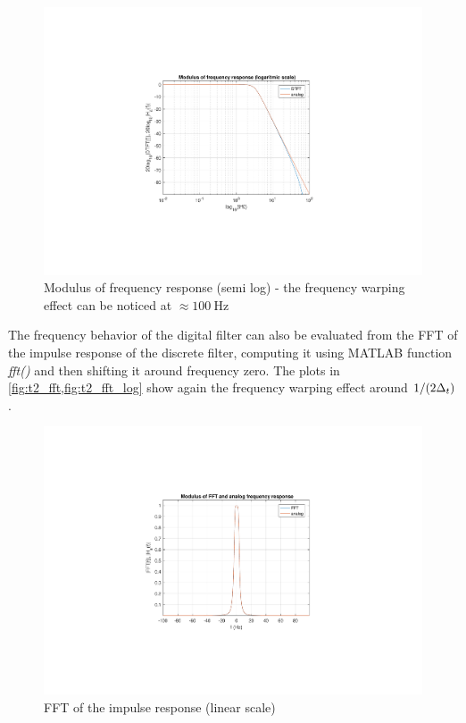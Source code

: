 \begin{figure} [H]
	\centering
	\includegraphics[trim={8cm 4.8cm 8cm 5cm}, clip, width=0.8\linewidth]{frequency_resp_log}
	\caption{Modulus of frequency response (semi log) - the frequency warping effect can be noticed at $\approx \SI{100}{\hertz}$}
	\label{fig:t2_dtft_log}
\end{figure}
The frequency behavior of the digital filter can also be evaluated from the FFT of the impulse response of the discrete filter, computing it using MATLAB function \textit{fft()} and then shifting it around frequency zero. The plots in \cref{fig:t2_fft,fig:t2_fft_log} show again the frequency warping effect around $1/(2\Delta_t)$.
\begin{figure}
	\centering
	\includegraphics[trim={8cm 4.8cm 8cm 5cm}, clip, width=0.8\linewidth]{fft}
	\caption{FFT of the impulse response (linear scale)}
	\label{fig:t2_fft}
\end{figure}
